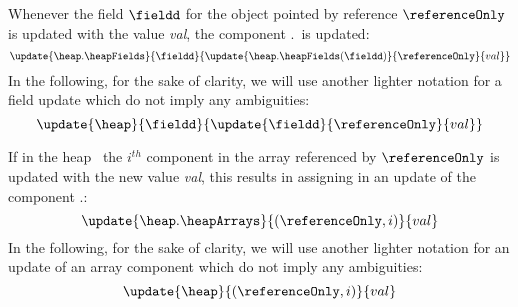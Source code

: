  




 
   Whenever the  field $\fieldd$ for the object pointed by reference
 $\referenceOnly$ is updated  with the value \textit{val},
 the component \heap.\heapFields \ is updated:
 $$ \update{\heap.\heapFields}{\fieldd}{\update{\heap.\heapFields(\fieldd)}{\referenceOnly}{val}} $$  
 In the following, for the sake of clarity, we will use another lighter notation for a field update which do not imply any ambiguities:
 $$ 
  \update{\heap}{\fieldd}{\update{\fieldd}{\referenceOnly}{val}} 
 $$ 



 If in the heap \heap \ 
 the $i^{th}$ component in the array referenced by $\referenceOnly$ is updated with the new value \textit{val},
 this results in assigning in an update of the component \heap.\heapArrays:
 $$\update{\heap.\heapArrays}{(\referenceOnly , i)}{val} $$ 
 In the following, for the sake of clarity, we will use another lighter notation for an update of an array component
 which do not imply any ambiguities:
 $$ 
  \update{\heap}{(\referenceOnly , i) }{val} 
 $$ 

 
 

